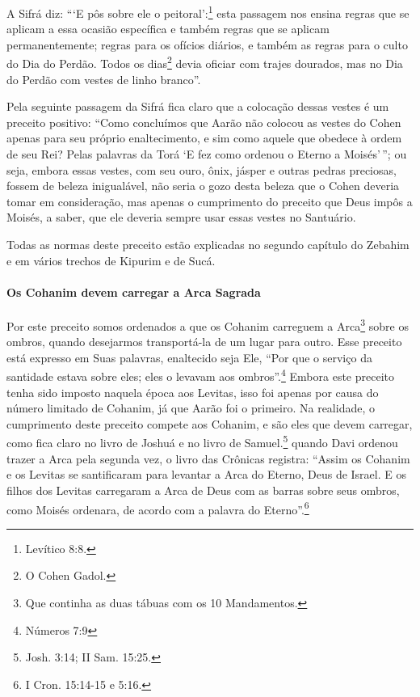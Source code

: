 A Sifrá diz: ```E pôs sobre ele o peitoral':\footnote{Levítico 8:8.} esta passagem nos ensina regras que se aplicam a essa ocasião específica e também regras
que se aplicam permanentemente; regras para os ofícios diários, e também
as regras para o culto do Dia do Perdão. Todos os dias\footnote{O Cohen Gadol.}
devia oficiar com trajes dourados, mas no Dia do Perdão com vestes de linho branco''.

Pela seguinte passagem da Sifrá fica claro que a colocação dessas vestes
é um preceito positivo: ``Como concluímos que Aarão não colocou as
vestes do Cohen apenas para seu próprio enaltecimento, e sim como
aquele que obedece à ordem de seu Rei? Pelas palavras da Torá `E fez
como ordenou o Eterno a Moisés'\,''; ou seja, embora essas vestes, com seu
ouro, ônix, jásper e outras pedras preciosas, fossem de beleza
inigualável, não seria o gozo desta beleza que o Cohen deveria tomar
em consideração, mas apenas o cumprimento do preceito que Deus impôs a
Moisés, a saber, que ele deveria sempre usar essas vestes no Santuário.

Todas as normas deste preceito estão explicadas no segundo capítulo do
Zebahim e em vários trechos de Kipurim e de Sucá.

\paragraph{Os Cohanim devem carregar a Arca Sagrada}


Por este preceito somos ordenados a que os Cohanim carreguem
a Arca\footnote{Que continha as duas tábuas com os 10 Mandamentos.} sobre os ombros, quando desejarmos
transportá-la de um lugar para
outro. Esse preceito está expresso em Suas palavras, enaltecido seja
Ele, ``Por que o serviço da santidade estava sobre eles; eles o levavam aos
ombros''.\footnote{Números 7:9} Embora este preceito tenha sido imposto naquela
época aos Levitas, isso foi apenas por causa do número limitado de
Cohanim, já que Aarão
foi o primeiro. Na realidade, o cumprimento deste preceito compete aos
Cohanim, e são eles que devem carregar, como fica claro no livro de
Joshuá e no livro de Samuel.\footnote{Josh. 3:14; II Sam. 15:25.} quando Davi ordenou trazer a
Arca pela segunda vez, o livro das Crônicas registra: ``Assim os Cohanim e os Levitas se santificaram
para levantar a Arca do Eterno, Deus de Israel. E os filhos dos Levitas
carregaram a Arca de Deus com as barras sobre seus ombros, como Moisés
ordenara, de acordo com a palavra do Eterno''.\footnote{I Cron. 15:14-15 e 5:16.}


